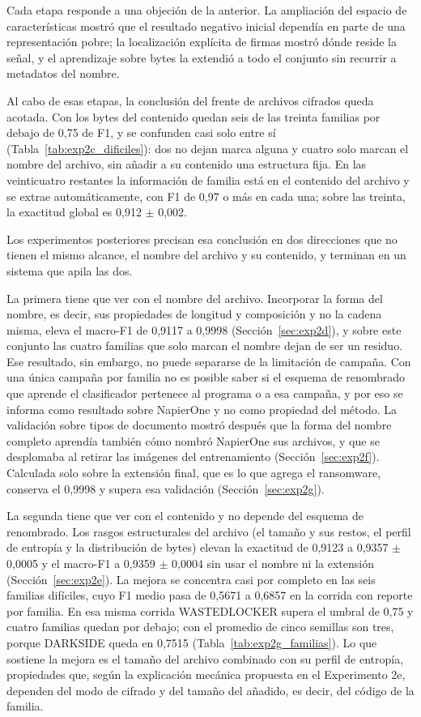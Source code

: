 Cada etapa responde a una objeción de la anterior. La ampliación del espacio de características mostró que el resultado negativo inicial dependía en parte de una representación pobre; la localización explícita de firmas mostró dónde reside la señal, y el aprendizaje sobre bytes la extendió a todo el conjunto sin recurrir a metadatos del nombre.

Al cabo de esas etapas, la conclusión del frente de archivos cifrados queda acotada. Con los bytes del contenido quedan seis de las treinta familias por debajo de 0,75 de F1, y se confunden casi solo entre sí (Tabla~\ref{tab:exp2c_dificiles}): dos no dejan marca alguna y cuatro solo marcan el nombre del archivo, sin añadir a su contenido una estructura fija. En las veinticuatro restantes la información de familia está en el contenido del archivo y se extrae automáticamente, con F1 de 0,97 o más en cada una; sobre las treinta, la exactitud global es 0,912 $\pm$ 0,002.

Los experimentos posteriores precisan esa conclusión en dos direcciones que no tienen el mismo alcance, el nombre del archivo y su contenido, y terminan en un sistema que apila las dos.

La primera tiene que ver con el nombre del archivo. Incorporar la forma del nombre, es decir, sus propiedades de longitud y composición y no la cadena misma, eleva el macro-F1 de 0,9117 a 0,9998 (Sección~\ref{sec:exp2d}), y sobre este conjunto las cuatro familias que solo marcan el nombre dejan de ser un residuo. Ese resultado, sin embargo, no puede separarse de la limitación de campaña. Con una única campaña por familia no es posible saber si el esquema de renombrado que aprende el clasificador pertenece al programa o a esa campaña, y por eso se informa como resultado sobre NapierOne y no como propiedad del método. La validación sobre tipos de documento mostró después que la forma del nombre completo aprendía también cómo nombró NapierOne sus archivos, y que se desplomaba al retirar las imágenes del entrenamiento (Sección~\ref{sec:exp2f}). Calculada solo sobre la extensión final, que es lo que agrega el ransomware, conserva el 0,9998 y supera esa validación (Sección~\ref{sec:exp2g}).

La segunda tiene que ver con el contenido y no depende del esquema de renombrado. Los rasgos estructurales del archivo (el tamaño y sus restos, el perfil de entropía y la distribución de bytes) elevan la exactitud de 0,9123 a 0,9357 $\pm$ 0,0005 y el macro-F1 a 0,9359 $\pm$ 0,0004 sin usar el nombre ni la extensión (Sección~\ref{sec:exp2e}). La mejora se concentra casi por completo en las seis familias difíciles, cuyo F1 medio pasa de 0,5671 a 0,6857 en la corrida con reporte por familia. En esa misma corrida WASTEDLOCKER supera el umbral de 0,75 y cuatro familias quedan por debajo; con el promedio de cinco semillas son tres, porque DARKSIDE queda en 0,7515 (Tabla~\ref{tab:exp2g_familias}). Lo que sostiene la mejora es el tamaño del archivo combinado con su perfil de entropía, propiedades que, según la explicación mecánica propuesta en el Experimento 2e, dependen del modo de cifrado y del tamaño del añadido, es decir, del código de la familia.

